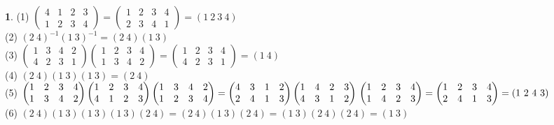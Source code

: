 \documentclass{article}
\theoremstyle{definition}
\newtheorem{ans}{}
\numberwithin{ans}{subsection}
\begin{document}
\begin{ans}
  (1) $\begin{pmatrix}
    4 & 1 & 2 & 3 \\
    1 & 2 & 3 & 4
  \end{pmatrix} =
  \begin{pmatrix}
    1 & 2 & 3 & 4 \\
    2 & 3 & 4 & 1
  \end{pmatrix} = (1\ 2\ 3\ 4)$ \\
  (2) $(2\ 4)^{-1}(1\ 3)^{-1} = (2\ 4)(1\ 3)$ \\
  (3) $\begin{pmatrix}
    1 & 3 & 4 & 2 \\
    4 & 2 & 3 & 1
  \end{pmatrix}\begin{pmatrix}
    1 & 2 & 3 & 4 \\
    1 & 3 & 4 & 2
  \end{pmatrix} = \begin{pmatrix}
    1 & 2 & 3 & 4 \\
    4 & 2 & 3 & 1
  \end{pmatrix} = (1\ 4)$ \\
  (4) $(2\ 4)(1\ 3)(1\ 3) = (2\ 4)$ \\
  (5) $\begin{pmatrix}
    1 & 2 & 3 & 4 \\
    1 & 3 & 4 & 2
  \end{pmatrix}\begin{pmatrix}
    1 & 2 & 3 & 4 \\
    4 & 1 & 2 & 3
  \end{pmatrix}\begin{pmatrix}
    1 & 3 & 4 & 2 \\
    1 & 2 & 3 & 4
  \end{pmatrix} = \begin{pmatrix}
    4 & 3 & 1 & 2 \\
    2 & 4 & 1 & 3
  \end{pmatrix}\begin{pmatrix}
    1 & 4 & 2 & 3 \\
    4 & 3 & 1 & 2
  \end{pmatrix}\\
  \begin{pmatrix}
    1 & 2 & 3 & 4 \\
    1 & 4 & 2 & 3
  \end{pmatrix} = \begin{pmatrix}
    1 & 2 & 3 & 4 \\
    2 & 4 & 1 & 3
  \end{pmatrix} = (1\ 2\ 4\ 3)$\\
  (6) $(2\ 4)(1\ 3)(1\ 3)(1\ 3)(2\ 4) = (2\ 4)(1\ 3)(2\ 4) = (1\ 3)(2\ 4)(2\ 4) = (1\ 3)$
\end{ans}
\end{document}
